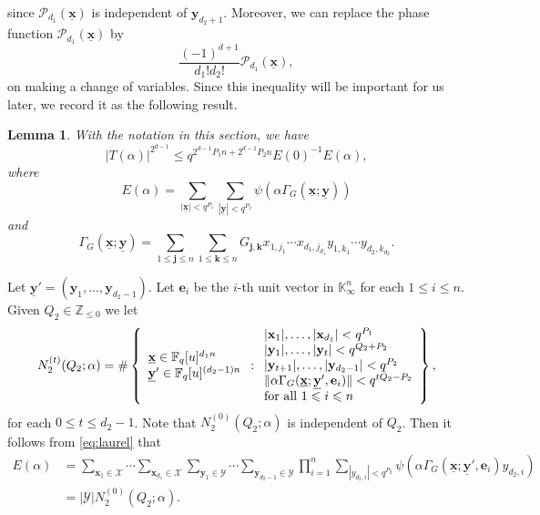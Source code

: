 \documentclass[12pt, reqno]{amsart}
\numberwithin{equation}{section}
\newcommand{\0}{\mathbf{0}}
\newcommand{\FF}{\mathbb{F}}
\newcommand{\ZZ}{\mathbb{Z}}
\newcommand{\KK}{\mathbb{K}}
\renewcommand{\leq}{\leqslant}
\newcommand{\x}{\mathbf{x}}
\newcommand{\y}{\mathbf{y}}
\renewcommand{\=}{\equiv}
\newcommand{\1}{\mathbf{1}}
\newtheorem{lemma}[theorem]{Lemma}
\theoremstyle{definition}
\begin{document}
since  $\mathcal{P}_{d_1}(\underline{\x})$ is independent of $\y_{d_2+1}$.
Moreover, 
we can replace the phase function $\mathcal{P}_{d_1}( \underline{\x} )$ by
$$
 \frac{ (-1)^{d+1} }{d_1! d_2!} \mathcal{P}_{d_1}( \underline{\x} ) ,
$$
on making 
a change of variables.
Since this inequality will be important for us later, we record it as the following result.


\begin{lemma}
\label{LEMMMM}
With the notation in this section, we have
$$
|T (\alpha)|^{2^{ d - 1} } \leq
q^{  2^{d - 1} P_1 n  +  2^{d - 1}  P_2 n }  E(0)^{-1}  E(\alpha),
$$
where
$$
E(\alpha) =
\sum_{  |\underline{ \mathbf{x} }| < q^{P_1} } \sum_{  |\underline{ \mathbf{y} }| < q^{P_2} }
\psi ( \alpha \Gamma_G( \underline{\x} ; \underline{\y}  ) )
$$
and
$$
\Gamma_G( \underline{\x} ; \underline{\y}  ) =
\sum_{ 1 \leq  \mathbf{j} \leq n }  \sum_{ 1 \leq  \mathbf{k} \leq n} G_{\mathbf{j}, \mathbf{k} }
 x_{1, j_1} \cdots x_{d_1, j_{d_1}}  y_{1, k_1} \cdots y_{{d_2}, k_{d_2}}.
$$
\end{lemma}

Let $\underline{\mathbf{y}}' = (\mathbf{y}_1, \ldots, \mathbf{y}_{d_2 - 1})$.
Let $\mathbf{e}_{i}$ be the $i$-th unit vector in $\KK^n_\infty$ for each $1 \leq i \leq n$.
Given $Q_2 \in \ZZ_{\leq 0}$ we let
$$
N_2^{(t)}(Q_2; \alpha)
=
\# \left\{
\begin{array}{l}
 \underline{\x} \in  \FF_q[u]^{d_1 n}\\
  \underline{\mathbf{y}}' \in\FF_q[u]^{(d_2-1)n} 
  \end{array}
  :
\begin{array}{l}
 |\x_1|, \ldots, |\x_{d_1}| < q^{P_1}   \\
 |\y_1|,\ldots, |\y_t| < q^{ Q_2 +  P_2}   \\
  |\y_{t + 1}|,\ldots, |\y_{d_2-1}|  <  q^{ P_2} \\
 \| \alpha \Gamma_G(  \underline{\x} ; \underline{\mathbf{y}}',  \mathbf{e}_{i} ) \| < q^{  t Q_2- P_2} \\
 \textnormal{for all $1 \leq i \leq n$}
\end{array}
\right\},
$$
for each $0 \leq t \leq d_2-1$. Note that $N_2^{(0)}(Q_2; \alpha)$ is independent of $Q_2$.
Then it follows from \eqref{eq:laurel} that
\begin{equation}\begin{split}
\label{exp bound with count 1}
E(\alpha)
&=  \sum_{\mathbf{x}_{1} \in \mathcal{X}} \cdots  \sum_{\mathbf{x}_{d_1} \in \mathcal{X}}  \sum_{\mathbf{y}_{1} \in \mathcal{Y}} \cdots
\sum_{\mathbf{y}_{d_2 - 1} \in \mathcal{Y}} \prod_{i = 1}^n
\sum_{ |y_{d_2, i}| < q^{P_2}  }
\psi  (  \alpha \Gamma_G ( \underline{\x};  \underline{\mathbf{y}}', \mathbf{e}_{i} ) y_{d_2, i}  )
 \\
&=  |\mathcal{Y}| N_2^{(0)}(Q_2; \alpha).
\end{split}\end{equation}
\end{document}
